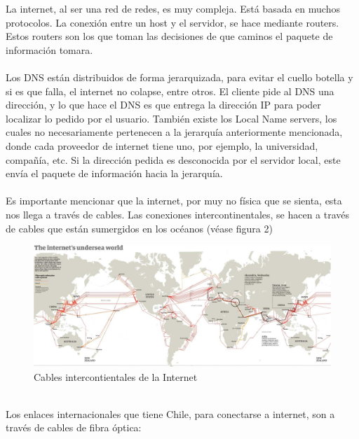 \documentclass[a4paper,10pt]{article}
\begin{document}
La internet, al ser una red de redes, es muy compleja. Está basada en muchos protocolos. La conexión entre un host y el servidor, se hace mediante routers. Estos routers son los que toman las decisiones de que caminos el paquete de información tomara. \\ \\

Los DNS están distribuidos de forma jerarquizada, para evitar el cuello botella y si es que falla, el internet no colapse, entre otros. El cliente pide al DNS una dirección, y lo que hace el DNS es que entrega la dirección IP para poder localizar lo pedido por el usuario. También existe los Local Name servers, los cuales no necesariamente pertenecen a la jerarquía anteriormente mencionada, donde cada proveedor de internet tiene uno, por ejemplo, la universidad, compañía, etc. Si la dirección pedida es desconocida por el servidor local, este envía el paquete de información hacia la jerarquía.\\ \\

Es importante mencionar que la internet, por muy no física que se sienta, esta nos llega a través de cables. Las conexiones intercontinentales, se hacen a través de cables que están sumergidos en los océanos (véase figura 2)\\

\begin{figure}[H]
\centering
\includegraphics[height=7 cm]{imagenes/seacable.png}
\caption{Cables intercontientales de la Internet}
\end{figure} \\ 

Los enlaces internacionales que tiene Chile, para conectarse a internet, son a través de cables de fibra óptica: \\ \\
\end{document}
